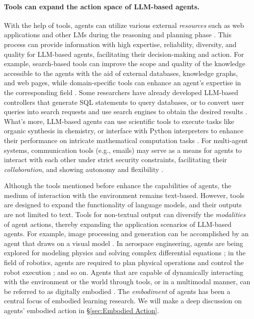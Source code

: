 \paragraph{Tools can expand the action space of LLM-based agents.}
With the help of tools, agents can utilize various external \textit{resources} such as web applications and other LMs during the reasoning and planning phase \cite{DBLP:journals/corr/abs-2302-04761}. 
This process can provide information with high expertise, reliability, diversity, and quality for LLM-based agents, facilitating their decision-making and action. 
For example, search-based tools can improve the scope and quality of the knowledge accessible to the agents with the aid of external databases, knowledge graphs, and web pages, while domain-specific tools can enhance an agent's expertise in the corresponding field \cite{DBLP:journals/corr/abs-2304-04370,DBLP:journals/corr/abs-2306-08302}. Some researchers have already developed LLM-based controllers that generate SQL statements to query databases, or to convert user queries into search requests and use search engines to obtain the desired results \cite{DBLP:journals/corr/abs-2112-09332,DBLP:journals/corr/abs-2306-03901}. 
What's more, LLM-based agents can use scientific tools to execute tasks like organic synthesis in chemistry, or interface with Python interpreters to enhance their performance on intricate mathematical computation tasks \cite{bran2023chemcrow, DBLP:journals/corr/abs-2308-03427}. For multi-agent systems, communication tools (e.g., emails) may serve as a means for agents to interact with each other under strict security constraints, facilitating their \textit{collaboration}, and showing autonomy and flexibility \cite{DBLP:journals/corr/abs-2304-08354}.

Although the tools mentioned before enhance the capabilities of agents, the medium of interaction with the environment remains text-based. 
However, tools are designed to expand the functionality of language models, and their outputs are not limited to text. 
Tools for non-textual output can diversify the \textit{modalities} of agent actions, thereby expanding the application scenarios of LLM-based agents. For example, image processing and generation can be accomplished by an agent that draws on a visual model \cite{DBLP:journals/corr/abs-2303-04671}. In aerospace engineering, agents are being explored for modeling physics and solving complex differential equations \cite{ogundare2023industrial}; in the field of robotics, agents are required to plan physical operations and control the robot execution \cite{DBLP:conf/corl/IchterBCFHHHIIJ22}; and so on. Agents that are capable of dynamically interacting with the environment or the world through tools, or in a multimodal manner, can be referred to as digitally embodied \cite{DBLP:journals/corr/abs-2304-08354}. The \textit{embodiment} of agents has been a central focus of embodied learning research. We will make a deep discussion on agents' embodied action in \S\ref{sec:Embodied Action}.


